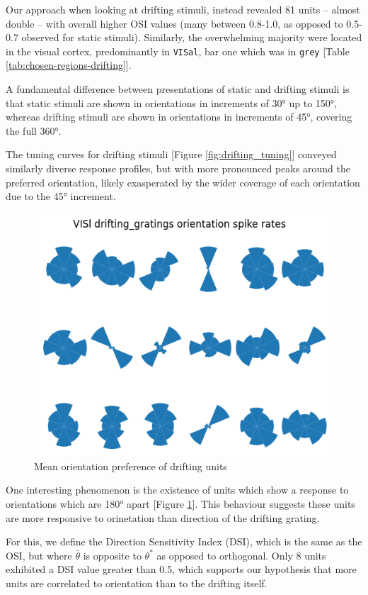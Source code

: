 \documentclass[10pt,twocolumn]{article}
\begin{document}
Our approach when looking at drifting stimuli, instead revealed 81 units -- almost double -- with overall higher OSI values (many between 0.8-1.0, as opposed to 0.5-0.7 observed for static stimuli). Similarly, the overwhelming majority were located in the visual cortex, predominantly in \texttt{VISal}, bar one which was in \texttt{grey} [Table \ref{tab:chosen-regions-drifting}].

A fundamental difference between presentations of static and drifting stimuli is that static stimuli are shown in orientations in increments of 30° up to 150°, whereas drifting stimuli are shown in orientations in increments of 45°, covering the full 360°.

The tuning curves for drifting stimuli [Figure \ref{fig:drifting_tuning}] conveyed similarly diverse response profiles, but with more pronounced peaks around the preferred orientation, likely exasperated by the wider coverage of each orientation due to the 45° increment.

\begin{figure}[h]
  \centering
  \includegraphics[width=0.6\linewidth]{report_images/drifting_unit_mean_orientation.png}
  \caption{Mean orientation preference of drifting units}
  \label{fig:drifting_unit_mean_orientation}
\end{figure}

One interesting phenomenon is the existence of units which show a response to orientations which are 180° apart [Figure \ref{fig:drifting_unit_mean_orientation}].  This behaviour suggests these units are more responsive to orinetation than direction of the drifting grating.

For this, we define the Direction Sensitivity Index (DSI), which is the same as the OSI, but where \(\bar\theta\) is opposite to \(\theta^*\) as opposed to orthogonal.  Only 8 units exhibited a DSI value greater than 0.5, which supports our hypothesis that more units are correlated to orientation than to the drifting itself.
\end{document}
